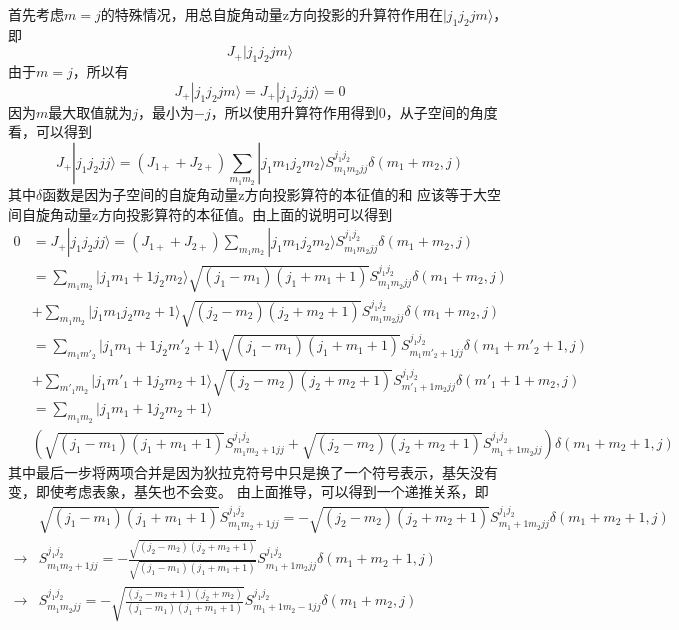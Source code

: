 \documentclass{article}
\begin{document}
首先考虑$m=j$的特殊情况，用总自旋角动量z方向投影的升算符作用在$|j_1 j_2 j m\rangle$，即
\begin{equation}
    J_+ |j_1 j_2 j m\rangle
\end{equation}
由于$m=j$，所以有
\begin{equation}
    J_+ |j_1 j_2 j m\rangle = J_+ |j_1 j_2 j j\rangle = 0
\end{equation}
因为$m$最大取值就为$j$，最小为$-j$，所以使用升算符作用得到$0$，从子空间的角度看，可以得到
\begin{equation}
    J_+ |j_1 j_2 j j\rangle = (J_{1+}+J_{2+})\sum_{m_1 m_2}|j_1 m_1 j_2 m_2\rangle
    S_{m_1 m_2 jj}^{j_1 j_2}\delta(m_1 + m_2, j)
\end{equation}
其中$\delta$函数是因为子空间的自旋角动量z方向投影算符的本征值的和
应该等于大空间自旋角动量z方向投影算符的本征值。由上面的说明可以得到
\begin{equation}
    \begin{aligned}
        0 &=J_+|j_1 j_2 jj\rangle =(J_{1+}+J_{2+})\sum_{m_1 m_2}|j_1 m_1 j_2 m_2\rangle
        S_{m_1 m_2 jj}^{j_1 j_2}\delta(m_1 + m_2, j)\\
        &= \sum_{m_1 m_2} |j_1 m_1+1 j_2 m_2\rangle\sqrt{(j_1-m_1)(j_1+m_1+1)}
        S_{m_1 m_2 jj}^{j_1 j_2}\delta(m_1+m_2, j)\\
        &+ \sum_{m_1 m_2} |j_1 m_1 j_2 m_2+1\rangle\sqrt{(j_2-m_2)(j_2+m_2+1)}
        S_{m_1 m_2 jj}^{j_1 j_2}\delta(m_1+m_2, j)\\
        &= \sum_{m_1 m'_2}|j_1 m_1+1 j_2 m'_2+1\rangle\sqrt{(j_1-m_1)(j_1+m_1+1)}
        S_{m_1 m'_2+1 jj}^{j_1 j_2}\delta(m_1+m'_2+1, j)\\
        &+ \sum_{m'_1 m_2} |j_1 m'_1+1 j_2 m_2+1\rangle\sqrt{(j_2-m_2)(j_2+m_2+1)}
        S_{m'_1+1 m_2 jj}^{j_1 j_2}\delta(m'_1+1+m_2, j)\\
        &= \sum_{m_1 m_2}|j_1 m_1+1 j_2 m_2+1\rangle\\
        &\left(\sqrt{(j_1-m_1)(j_1+m_1+1)}S_{m_1 m_2+1 jj}^{j_1 j_2}
        +\sqrt{(j_2-m_2)(j_2+m_2+1)}S_{m_1+1 m_2 jj}^{j_1 j_2}\right)\delta(m_1+m_2+1,j)
    \end{aligned}
\end{equation}
其中最后一步将两项合并是因为狄拉克符号中只是换了一个符号表示，基矢没有变，即使考虑表象，基矢也不会变。
由上面推导，可以得到一个递推关系，即
\begin{equation}
    \begin{aligned}
        &\sqrt{(j_1-m_1)(j_1+m_1+1)}S_{m_1 m_2+1 jj}^{j_1 j_2}
        = -\sqrt{(j_2-m_2)(j_2+m_2+1)}S_{m_1+1 m_2 jj}^{j_1 j_2}\delta(m_1+m_2+1,j)\\
        \rightarrow
        & S_{m_1 m_2+1 jj}^{j_1 j_2}
        =-\frac{\sqrt{(j_2-m_2)(j_2+m_2+1)}}{\sqrt{(j_1-m_1)(j_1+m_1+1)}}
        S_{m_1+1 m_2 jj}^{j_1 j_2}\delta(m_1+m_2+1,j)\\
        \rightarrow 
        & S_{m_1 m_2 jj}^{j_1 j_2}
        = -\sqrt{\frac{(j_2-m_2+1)(j_2+m_2)}{(j_1-m_1)(j_1+m_1+1)}}
        S_{m_1+1 m_2-1 jj}^{j_1 j_2}\delta(m_1+m_2,j)\\
    \end{aligned}
\end{equation}
\end{document}
